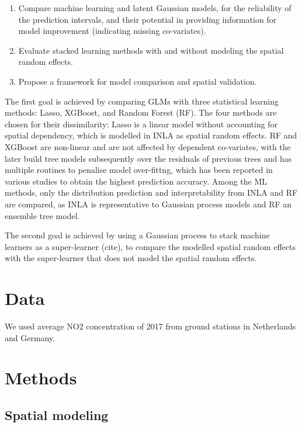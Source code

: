 \documentclass{article}
\begin{document}
\begin{enumerate}
    \item Compare machine learning and latent Gaussian models, for the reliability of the prediction intervals, and their potential in providing information for model improvement (indicating missing co-variates).
    
    \item Evaluate stacked learning methods with and without modeling the spatial random effects.

    \item Propose a framework for model comparison and spatial validation. 
\end{enumerate}

The first goal is achieved by comparing GLMs with three statistical learning methods: Lasso, XGBoost, and Random Forest (RF). The four methods are chosen for their dissimilarity: Lasso is a linear model without accounting for spatial dependency, which is modelled in INLA as spatial random effects. RF and XGBoost are non-linear and are not affected by dependent co-variates, with the later build tree models subsequently over the residuals of previous trees and has multiple routines to penalise model over-fittng, which has been reported in various studies to obtain the highest prediction accuracy. Among the ML methods, only the distribution prediction and interpretability from INLA and RF are compared, as INLA is representative to Gaussian process models and RF an ensemble tree model.

The second goal is achieved by using a Gaussian process to stack machine learners as a super-learner (cite), to compare the modelled spatial random effects with the super-learner that does not model the spatial random effects. 

 
 
\section{Data}
We used average NO2 concentration of 2017 from ground stations in Netherlands and Germany.

\section {Methods}

\subsection{Spatial modeling}
\end{document}
